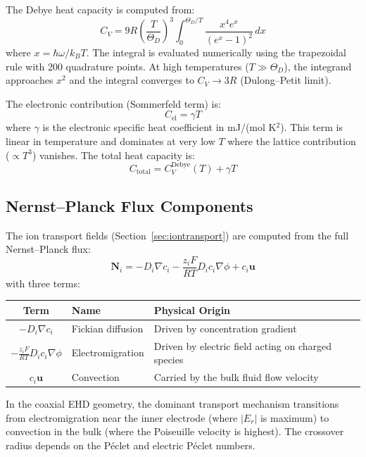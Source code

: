 \documentclass[11pt,a4paper]{article}
\begin{document}
The Debye heat capacity is computed from:
\begin{equation}
  C_V = 9 R \left(\frac{T}{\Theta_D}\right)^3
  \int_0^{\Theta_D/T} \frac{x^4 e^x}{(e^x - 1)^2}\,dx
\end{equation}
where $x = \hbar\omega / k_B T$.  The integral is evaluated numerically
using the trapezoidal rule with 200 quadrature points.  At high
temperatures ($T \gg \Theta_D$), the integrand approaches $x^2$ and
the integral converges to $C_V \to 3R$ (Dulong--Petit limit).

The electronic contribution (Sommerfeld term) is:
\begin{equation}
  C_{\text{el}} = \gamma T
\end{equation}
where $\gamma$ is the electronic specific heat coefficient in
mJ/(mol K$^2$).  This term is linear in temperature and dominates
at very low $T$ where the lattice contribution ($\propto T^3$)
vanishes.  The total heat capacity is:
\begin{equation}
  C_{\text{total}} = C_V^{\text{Debye}}(T) + \gamma T
\end{equation}

\subsection{Nernst--Planck Flux Components}

The ion transport fields (Section~\ref{sec:iontransport}) are computed
from the full Nernst--Planck flux:
\begin{equation}
  \mathbf{N}_i = -D_i \nabla c_i
    - \frac{z_i F}{RT} D_i c_i \nabla \phi
    + c_i \mathbf{u}
\end{equation}
with three terms:

\begin{center}
\begin{tabular}{clp{7cm}}
\toprule
\textbf{Term} & \textbf{Name} & \textbf{Physical Origin} \\
\midrule
$-D_i \nabla c_i$ & Fickian diffusion & Driven by concentration gradient \\
$-\frac{z_i F}{RT} D_i c_i \nabla \phi$ & Electromigration &
  Driven by electric field acting on charged species \\
$c_i \mathbf{u}$ & Convection &
  Carried by the bulk fluid flow velocity \\
\bottomrule
\end{tabular}
\end{center}

\noindent In the coaxial EHD geometry, the dominant transport mechanism
transitions from electromigration near the inner electrode (where
$|E_r|$ is maximum) to convection in the bulk (where the Poiseuille
velocity is highest).  The crossover radius depends on the
P\'eclet and electric P\'eclet numbers.
\end{document}

